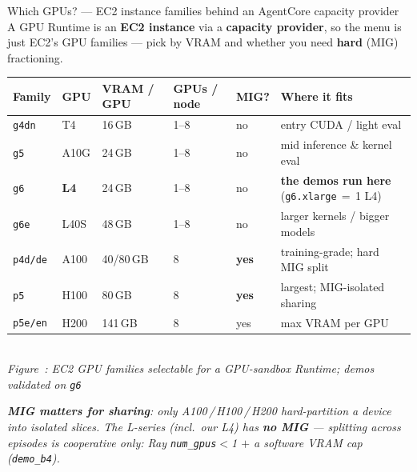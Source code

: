 \documentclass[aspectratio=169]{beamer}
\newcounter{deckfig}
\newcommand{\figtag}[1]{\refstepcounter{deckfig}%
  {\scriptsize\itshape Figure~\thedeckfig: #1}}
\begin{document}
\begin{frame}{Which GPUs? --- EC2 instance families behind an AgentCore capacity provider}
  \footnotesize A GPU Runtime is an \textbf{EC2 instance} via a \textbf{capacity provider}, so the menu is
  just EC2's GPU families --- pick by VRAM and whether you need \textbf{hard} (MIG) fractioning.
  \begin{center}
  \renewcommand{\arraystretch}{0.55}\scriptsize
  \begin{tabular}{@{}p{1.35cm}p{1.5cm}p{1.5cm}p{1.35cm}p{1.05cm}p{3.9cm}@{}}
    \toprule
    \textbf{Family} & \textbf{GPU} & \textbf{VRAM / GPU} & \textbf{GPUs / node} & \textbf{MIG?} & \textbf{Where it fits} \\
    \midrule
    \texttt{g4dn} & T4 & 16\,GB & 1--8 & no & entry CUDA / light eval \\
    \texttt{g5} & A10G & 24\,GB & 1--8 & no & mid inference \& kernel eval \\
    \texttt{g6} & \textbf{L4} & 24\,GB & 1--8 & no & \textbf{the demos run here} (\texttt{g6.xlarge}\,$=$\,1 L4) \\
    \texttt{g6e} & L40S & 48\,GB & 1--8 & no & larger kernels / bigger models \\
    \midrule
    \texttt{p4d/de} & A100 & 40/80\,GB & 8 & \textbf{yes} & training-grade; hard MIG split \\
    \texttt{p5} & H100 & 80\,GB & 8 & \textbf{yes} & largest; MIG-isolated sharing \\
    \texttt{p5e/en} & H200 & 141\,GB & 8 & yes & max VRAM per GPU \\
    \bottomrule
  \end{tabular}
  \\\figtag{EC2 GPU families selectable for a GPU-sandbox Runtime; demos validated on \texttt{g6}}
  \end{center}
  \vspace{-0.1em}
  {\scriptsize\itshape \textbf{MIG matters for sharing}: only A100\,/\,H100\,/\,H200 hard-partition a device
  into isolated slices. The L-series (incl.\ our L4) has \textbf{no MIG} --- splitting across episodes is
  \emph{cooperative} only: Ray \texttt{num\_gpus}$<$1 $+$ a software VRAM cap (\texttt{demo\_b4}).}
\end{frame}
\end{document}
